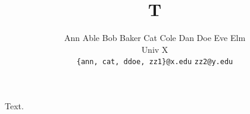 \documentclass{article}
\begin{document}
\title{T}
\author{Ann Able \quad Bob Baker \quad Cat Cole \quad Dan Doe \quad Eve Elm\\ Univ X\\ \texttt{\{ann, cat, ddoe, zz1\}@x.edu} \quad \texttt{zz2@y.edu}}
\maketitle
Text.
\end{document}
